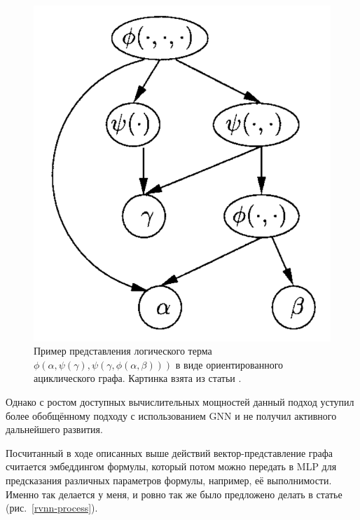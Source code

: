 \begin{figure}[!ht]
\begin{center}
    \includegraphics[scale=0.2]{./assets/rvnn-term-dag.png}
    \caption{\label{rvnn-term-dag} Пример представления логического терма $\phi(\alpha, \psi(\gamma), \psi(\gamma, \phi(\alpha, \beta)))$ в виде ориентированного ациклического графа. Картинка взята из статьи \cite{rvnn-intro-paper-2}.}
\end{center}
\end{figure}

Однако с ростом доступных вычислительных мощностей данный подход уступил более обобщённому подходу с использованием GNN и не получил активного дальнейшего развития.

Посчитанный в ходе описанных выше действий вектор-представление графа считается эмбеддингом формулы, который потом можно передать в MLP для предсказания различных параметров формулы, например, её выполнимости. Именно так делается у меня, и ровно так же было предложено делать в статье \cite{rvnn-intro-paper} (рис.~\ref{rvnn-process}).

